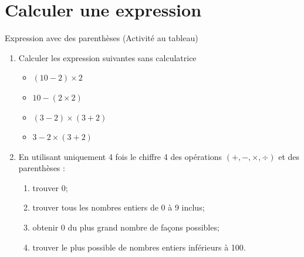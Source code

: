 \documentclass[14pt,a4paper]{extarticle}
\begin{document}
\section{Calculer une expression}


\begin{myact}{Expression avec des parenthèses}
	(Activité au tableau)
	
	\begin{enumerate}
		\item Calculer les expression suivantes sans calculatrice
		
		\begin{multicols}{2}
			\begin{itemize}
				\item $(10 - 2)  \times 2$
				\item $ 10 - (2 \times 2 )$
				\item $ (3 -2) \times (3 + 2)$
				\item $ 3 - 2 \times (3 + 2)$
			\end{itemize}
		\end{multicols}
	
		\item En utilisant uniquement 4 fois le chiffre 4 des opérations $(+, -, \times , \div)$ et des parenthèses :
			\begin{enumerate}
				\item trouver 0;
				\item trouver tous les nombres entiers de 0 à 9 inclus;
				\item obtenir 0 du plus grand nombre de façons possibles;
				\item trouver le plus possible de nombres entiers inférieurs à 100.
			\end{enumerate}
	\end{enumerate}
\end{myact}

%				
\end{document}
